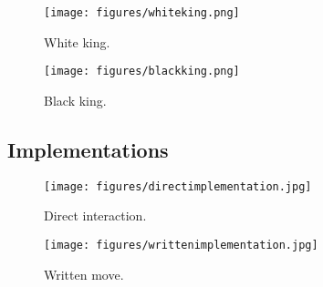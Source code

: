 \documentclass[12pt, a4paper]{article}
\begin{document}
\begin{figure}[h!]
\centering
\begin{minipage}{.5\textwidth}
  \centering
  \texttt{[image: figures/whiteking.png]}
  \caption{White king.}
\end{minipage}%
\begin{minipage}{.5\textwidth}
  \centering
  \texttt{[image: figures/blackking.png]}
  \caption{Black king.}
\end{minipage}
\end{figure}

\vfill
\clearpage

\newpage
\vfill
\subsection{Implementations}
\begin{figure}[ht!]
\centering
\texttt{[image: figures/directimplementation.jpg]}
\caption{Direct interaction.}
\end{figure}

\begin{figure}[ht!]
\centering
\texttt{[image: figures/writtenimplementation.jpg]}
\caption{Written move.}
\end{figure}

\vfill
\clearpage
\end{document}

